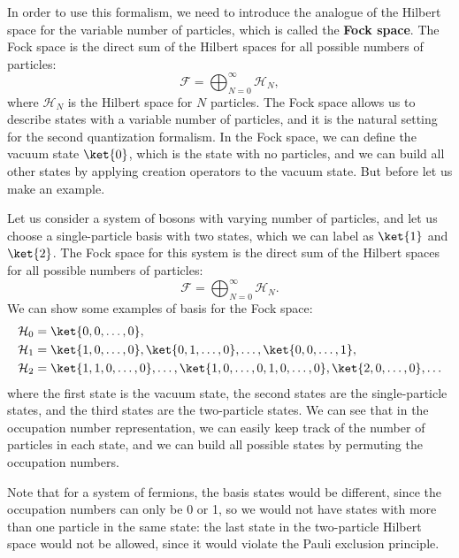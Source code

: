 In order to use this formalism, we need to introduce the analogue of the Hilbert space for the variable number of particles, which is called the \textbf{Fock space}. The Fock space is the direct sum of the Hilbert spaces for all possible numbers of particles:
\[
    \mathcal{F} = \bigoplus_{N=0}^{\infty} \mathcal{H}_N,
\]
where \(\mathcal{H}_N\) is the Hilbert space for \(N\) particles. The Fock space allows us to describe states with a variable number of particles, and it is the natural setting for the second quantization formalism. In the Fock space, we can define the vacuum state \(\ket{0}\), which is the state with no particles, and we can build all other states by applying creation operators to the vacuum state. But before let us make an example.

\begin{example}
    Let us consider a system of bosons with varying number of particles, and let us choose a single-particle basis with two states, which we can label as \(\ket{1}\) and \(\ket{2}\). The Fock space for this system is the direct sum of the Hilbert spaces for all possible numbers of particles:
    \[
        \mathcal{F} = \bigoplus_{N=0}^{\infty} \mathcal{H}_N.
    \]
    We can show some examples of basis for the Fock space:
    \[
        \begin{aligned}
            \mathcal{H}_0 & = \ket{0, 0, \ldots, 0},                                                                                  \\
            \mathcal{H}_1 & = \ket{1, 0, \ldots, 0}, \ket{0, 1, \ldots, 0}, \ldots, \ket{0, 0, \ldots, 1},                            \\
            \mathcal{H}_2 & = \ket{1, 1, 0, \ldots, 0}, \ldots, \ket{1, 0, \ldots, 0, 1, 0, \ldots, 0}, \ket{2, 0, \ldots, 0}, \ldots \\
        \end{aligned}
    \]
    where the first state is the vacuum state, the second states are the single-particle states, and the third states are the two-particle states. We can see that in the occupation number representation, we can easily keep track of the number of particles in each state, and we can build all possible states by permuting the occupation numbers.

    Note that for a system of fermions, the basis states would be different, since the occupation numbers can only be 0 or 1, so we would not have states with more than one particle in the same state: the last state in the two-particle Hilbert space would not be allowed, since it would violate the Pauli exclusion principle.
\end{example}


